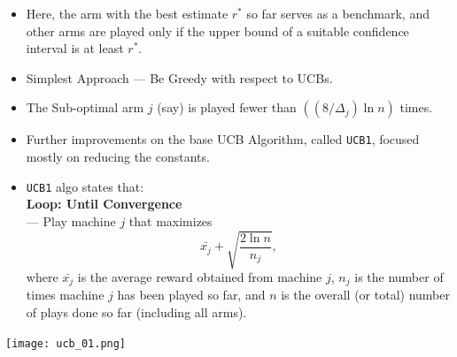\begin{minipage}{0.85\textwidth}
\begin{itemize}[leftmargin=*]
    \item Here, the arm with the best estimate $r^*$ so far serves as a benchmark, and other arms are played only if the upper bound of a suitable confidence interval is at least $r^*$.
    \item Simplest Approach --- Be Greedy with respect to UCBs.
    \item The Sub-optimal arm $j$ (say) is played fewer than $((8/\Delta_j) \ln n)$ times. 
    \item Further improvements on the base UCB Algorithm, called \texttt{UCB1}, focused mostly on reducing the constants.
    \item \texttt{UCB1} algo states that:\\
    \textbf{Loop: Until Convergence}\\
        \hspace{20pt} --- Play machine $j$ that maximizes $$\bar{x_j} + \sqrt{\frac{2 \ln n}{n_j}},$$ where $\bar{x_j}$ is the average reward obtained from machine $j$, $n_j$ is the number of times machine $j$ has been played so far, and $n$ is the overall (or total) number of plays done so far (including all arms).
\end{itemize}
\end{minipage}%
\hfill
\begin{minipage}{0.15\textwidth}
    \texttt{[image: ucb\_01.png]}
\end{minipage}%
